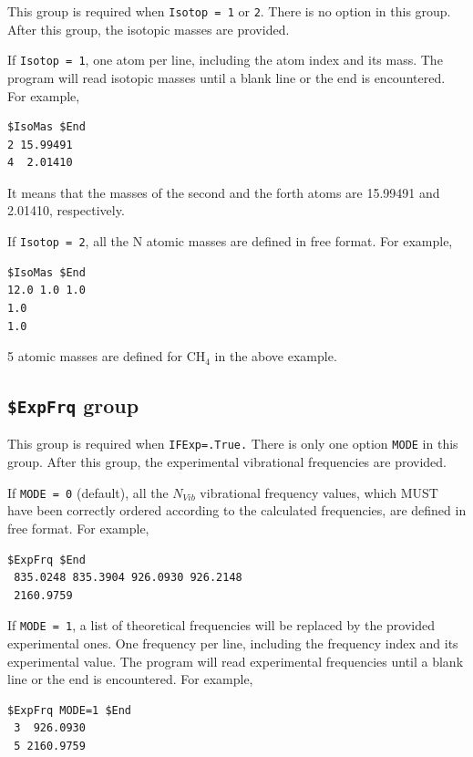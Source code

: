 \documentclass[12pt,english]{extarticle}
\begin{document}
This group is required when \verb|Isotop = 1| or \verb|2|. There is no option in
this group. After this group, the isotopic masses are provided.

\bigskip{}
If \verb|Isotop = 1|, one atom per line, including the atom index and its
mass. The program will read isotopic masses until a blank line or
the end is encountered. For example,
\begin{Verbatim}[frame=single]
 $IsoMas $End
2 15.99491
4  2.01410
\end{Verbatim}
It means that the masses of the second and the forth atoms are 15.99491 and
2.01410, respectively.

\bigskip{}
If \verb|Isotop = 2|, all the N atomic masses are defined in free format.
For example,
\begin{Verbatim}[frame=single]
 $IsoMas $End
12.0 1.0 1.0
1.0
1.0
\end{Verbatim}
5 atomic masses are defined for CH$_4$ in the above example.


\subsection{\texttt{\$ExpFrq} group} \label{sec:inp-expfrq}

This group is required when \verb|IFExp=.True.| There is only one option
\verb|MODE| in this group. After this group, the experimental vibrational
frequencies are provided.

\bigskip{}
If \verb|MODE = 0| (default), all the $N_{Vib}$ vibrational frequency values, which MUST have been correctly
ordered according to the calculated frequencies, are defined in free format. For example,
\begin{Verbatim}[frame=single]
 $ExpFrq $End
 835.0248 835.3904 926.0930 926.2148
 2160.9759
\end{Verbatim}

If \verb|MODE = 1|, a list of theoretical frequencies will be replaced by
the provided experimental ones. One frequency per line, including the
frequency index and its experimental value. The program will
read experimental frequencies until a blank line or the end is encountered.
For example,
\begin{Verbatim}[frame=single]
 $ExpFrq MODE=1 $End
 3  926.0930
 5 2160.9759
\end{Verbatim}
\end{document}
